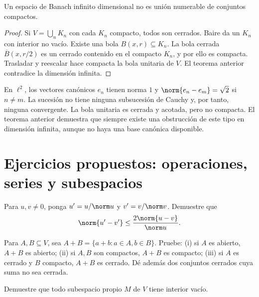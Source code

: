 \begin{corolario}\label{ch22:no-sigma-compacto}
Un espacio de Banach infinito dimensional no es unión numerable de conjuntos compactos.
\end{corolario}
\begin{proof}
Si $V=\bigcup_nK_n$ con cada $K_n$ compacto, todos son cerrados. Baire da un $K_n$ con interior no vacío. Existe una bola $B(x,r)\subseteq K_n$. La bola cerrada $\overline B(x,r/2)$ es un cerrado contenido en el compacto $K_n$, y por ello es compacta. Trasladar y reescalar hace compacta la bola unitaria de $V$. El teorema anterior contradice la dimensión infinita.
\end{proof}

\begin{ejemplo}
En $\ell^2$, los vectores canónicos $e_n$ tienen norma $1$ y $\norm{e_n-e_m}=\sqrt2$ si $n\ne m$. La sucesión no tiene ninguna subsucesión de Cauchy y, por tanto, ninguna convergente. La bola unitaria es cerrada y acotada, pero no compacta. El teorema anterior demuestra que siempre existe una obstrucción de este tipo en dimensión infinita, aunque no haya una base canónica disponible.
\end{ejemplo}

\section{Ejercicios propuestos: operaciones, series y subespacios}

\begin{ejercicio}\label{ej:lectura-19-1}
Para $u,v\ne0$, ponga $u'=u/\norm u$ y $v'=v/\norm v$. Demuestre que
\[\norm{u'-v'}\leq\frac{2\norm{u-v}}{\norm u}.\]
\end{ejercicio}


\begin{ejercicio}\label{ej:lectura-19-2}
Para $A,B\subseteq V$, sea $A+B=\{a+b:a\in A,b\in B\}$. Pruebe: (i) si $A$ es abierto, $A+B$ es abierto; (ii) si $A,B$ son compactos, $A+B$ es compacto; (iii) si $A$ es cerrado y $B$ compacto, $A+B$ es cerrado. Dé además dos conjuntos cerrados cuya suma no sea cerrada.
\end{ejercicio}


\begin{ejercicio}\label{ej:lectura-19-3}
Demuestre que todo subespacio propio $M$ de $V$ tiene interior vacío.
\end{ejercicio}



